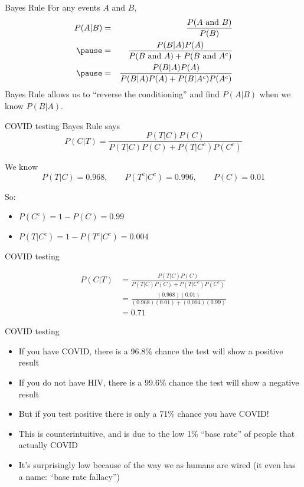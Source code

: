 \documentclass{beamer}\usepackage[]{graphicx}\usepackage[]{color}
\begin{document}
\begin{darkframes}
\begin{frame}{Bayes Rule}
  For any events $A$ and $B$,
  \begin{eqnarray*}
    P(A|B) &=& \dfrac{P(\text{$A$ and $B$})}{P(B)} \\ \pause 
    &=& \dfrac{P(B|A)P(A)}{P(\text{$B$ and $A$}) + P(\text{$B$ and $A^c$})} \\ \pause
    &=& \dfrac{P(B|A)P(A)}{P(B|A)P(A) + P(B|A^c)P(A^c)}
  \end{eqnarray*}
  \pause
  Bayes Rule allows us to ``reverse the conditioning'' and find $P(A|B)$ when we know $P(B|A)$.
\end{frame}

\begin{frame}{COVID testing}
  Bayes Rule says
  \[
    P(C|T) = \frac{P(T|C)P(C)}{P(T|C)P(C) + P(T|C^c)P(C^c)}
  \]

  We know
  \[ P(T|C) = 0.968, \qquad P(T^c|C^c) = 0.996, \qquad P(C) = 0.01 \]

  \pause

  So:
  \begin{itemize}[<+->]
    \item $P(C^c) = 1-P(C) = 0.99$
    \item $P(T|C^c) = 1-P(T^c|C^c) = 0.004$
  \end{itemize}
\end{frame}

\begin{frame}{COVID testing}


\begin{align*}
  P(C|T) &= \frac{ P(T|C)P(C) }{ P(T|C)P(C) + P(T|C^c)P(C^c) } \\
  &= \frac{ (0.968)(0.01) }{ (0.968)(0.01) + (0.004)(0.99) } \\
  &= 0.71
\end{align*}
\end{frame}

\begin{frame}{COVID testing}
  \begin{itemize}[<+->]
    \item If you have COVID, there is a 96.8\% chance the test will show a positive result
    \item If you do not have HIV, there is a 99.6\% chance the test will show a negative result
    \item But if you test positive there is only a 71\% chance you have COVID!
    \item This is counterintuitive, and is due to the low 1\% ``base rate'' of people that actually COVID
    \item It's surprisingly low because of the way we as humans are wired (it even has a name: ``base rate fallacy'')
  \end{itemize}
\end{frame}


\end{darkframes}
\end{document}
